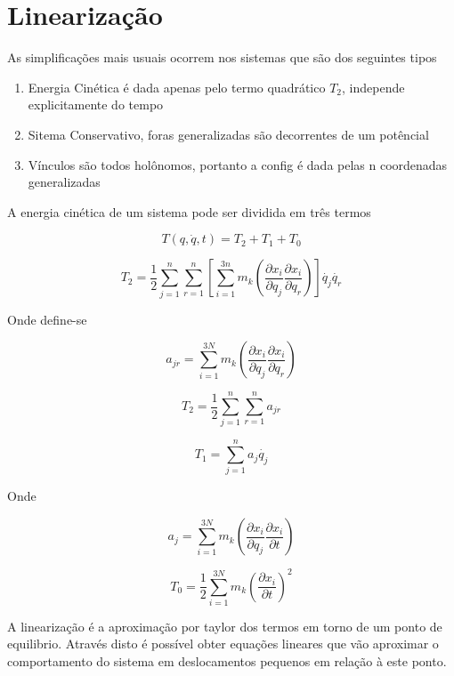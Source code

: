 \section{Linearização}

As simplificações mais usuais ocorrem nos sistemas que são dos seguintes tipos

\begin{enumerate}
	\item Energia Cinética é dada apenas pelo termo quadrático $T_2$, independe explicitamente do tempo
	\item Sitema Conservativo, foras generalizadas são decorrentes de um potêncial
	\item Vínculos são todos holônomos, portanto a config é dada pelas n coordenadas generalizadas
\end{enumerate}

A energia cinética de um sistema pode ser dividida em três termos

$$ T(q, \dot{q}, t) = T_2 + T_1 + T_0 $$

\begin{namedtheorem}[T_2]

$$ T_2 = \frac{1}{2}\sum_{j=1}^n \sum_{r=1}^n [\sum_{i=1}^{3n} m_k(\frac{\partial x_i}{\partial q_j} \frac{\partial x_i}{\partial q_r})] \dot{q_j} \dot{q_r} $$

Onde define-se

$$ a_{jr} = \sum_{i=1}^{3N} m_k(\frac{\partial x_i}{\partial q_j} \frac{\partial x_i}{\partial q_r}) $$

$$T_2 = \frac{1}{2}\sum_{j=1}^n \sum_{r=1}^n a_{jr}  $$

\end{namedtheorem}

\begin{namedtheorem}[T_1 Centrífugo]
$$ T_1 = \sum_{j=1}^n a_j\dot{q_j} $$

Onde

$$ a_j = \sum_{i=1}^{3N} m_k (\frac{\partial x_i}{\partial q_j} \frac{\partial x_i}{\partial t}) $$

\end{namedtheorem}

\begin{namedtheorem}[T_0 Giroscópico]

$$ T_0 = \frac{1}{2} \sum_{i=1}^{3N} m_k (\frac{\partial x_i}{\partial t})^2 $$

\end{namedtheorem}

A linearização é a aproximação por taylor dos termos em torno de um ponto de equilibrio. Através disto é possível obter equações lineares que vão aproximar o comportamento do sistema em deslocamentos pequenos em relação à este ponto.

